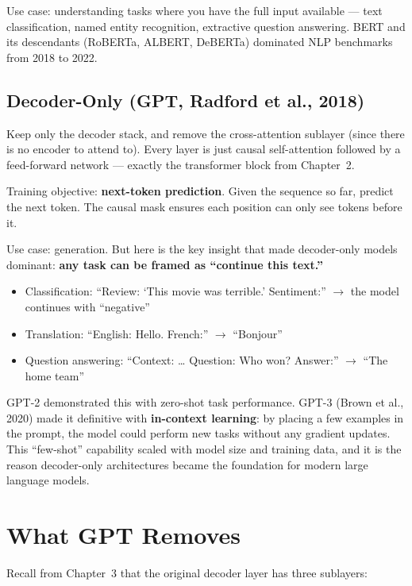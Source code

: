 Use case: understanding tasks where you have the full input available --- text classification, named entity recognition, extractive question answering. BERT and its descendants (RoBERTa, ALBERT, DeBERTa) dominated NLP benchmarks from 2018 to 2022.

\subsection{Decoder-Only (GPT, Radford et al., 2018)}

Keep only the decoder stack, and remove the cross-attention sublayer (since there is no encoder to attend to). Every layer is just causal self-attention followed by a feed-forward network --- exactly the transformer block from Chapter~2.

Training objective: \textbf{next-token prediction}. Given the sequence so far, predict the next token. The causal mask ensures each position can only see tokens before it.

Use case: generation. But here is the key insight that made decoder-only models dominant: \textbf{any task can be framed as ``continue this text.''}

\begin{itemize}
  \item Classification: ``Review: `This movie was terrible.' Sentiment:'' $\rightarrow$ the model continues with ``negative''
  \item Translation: ``English: Hello. French:'' $\rightarrow$ ``Bonjour''
  \item Question answering: ``Context: \ldots{} Question: Who won? Answer:'' $\rightarrow$ ``The home team''
\end{itemize}

GPT-2 demonstrated this with zero-shot task performance. GPT-3 (Brown et al., 2020) made it definitive with \textbf{in-context learning}: by placing a few examples in the prompt, the model could perform new tasks without any gradient updates. This ``few-shot'' capability scaled with model size and training data, and it is the reason decoder-only architectures became the foundation for modern large language models.

\section{What GPT Removes}

Recall from Chapter~3 that the original decoder layer has three sublayers:

